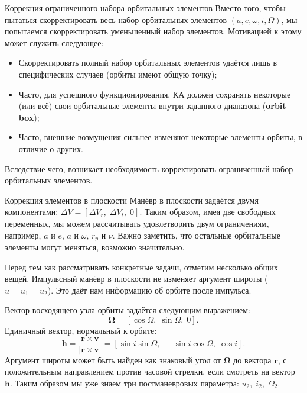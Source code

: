 \documentclass[9pt]{beamer}
\begin{document}
\begin{frame}{Коррекция ограниченного набора орбитальных элементов}
Вместо того, чтобы пытаться скорректировать весь набор орбитальных элементов $(a, e, \omega, i, \Omega)$, мы попытаемся скорректировать уменьшенный набор элементов. Мотивацией к этому может служить следующее:
\begin{itemize}
    \item Скорректировать полный набор орбитальных элементов удаётся лишь в специфических случаев (орбиты имеют общую точку);
    \item Часто, для успешного функционирования, КА должен сохранять некоторые (или всё) свои орбитальные элементы внутри заданного диапазона (\textbf{orbit box});
    \item Часто, внешние возмущения сильнее изменяют некоторые элементы орбиты, в отличие о других.
\end{itemize}
Вследствие чего, возникает необходимость корректировать ограниченный набор орбитальных элементов. 
\end{frame}

\begin{frame}{Коррекция элементов в плоскости}
Манёвр в плоскости задаётся двумя компонентами: $\Delta V = [\Delta V_r, \; \Delta V_t, \; 0]$. Таким образом, имея две свободных переменных, мы можем рассчитывать удовлетворить двум ограничениям, например, $a$ и $e$, $a$ и $\omega$, $r_p$ и $\nu$. Важно заметить, что остальные орбитальные элементы могут меняться, возможно значительно. 

Перед тем как рассматривать конкретные задачи, отметим несколько общих вещей. Импульсный манёвр в плоскости не изменяет аргумент широты ($u = u_1 = u_2$). Это даёт нам информацию об орбите после импульса.

Вектор восходящего узла орбиты задаётся следующим выражением:
\begin{equation*}
    \boldsymbol{\Omega} = [\cos \Omega, \; \sin \Omega, \; 0].
\end{equation*}
Единичный вектор, нормальный к орбите:
\begin{equation*}
    \mathbf{h} = \frac{\mathbf{r} \times \mathbf{v}}{\vert \mathbf{r} \times \mathbf{v} \vert} = [\sin i \sin \Omega, \; -\sin i \cos \Omega, \; \cos i].
\end{equation*}
Аргумент широты может быть найден как знаковый угол от $\boldsymbol{\Omega}$ до вектора $\mathbf{r}$, с положительным направлением против часовой стрелки, если смотреть на вектор $\mathbf{h}$. Таким образом мы уже знаем три постманевровых параметра: $u_2, \; i_2, \; \Omega_2$.
\end{frame}
\end{document}
